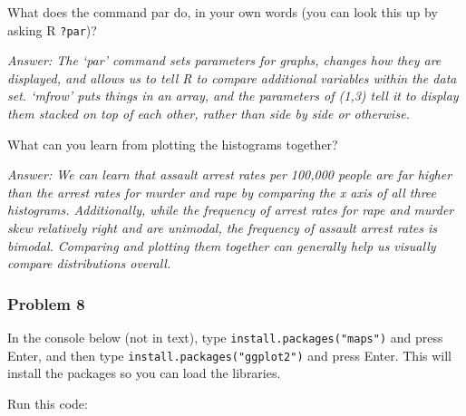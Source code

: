 \documentclass[
]{article}
\newenvironment{Shaded}{\begin{snugshade}}{\end{snugshade}}
\newcommand{\AttributeTok}[1]{\textcolor[rgb]{0.77,0.63,0.00}{#1}}
\newcommand{\CommentTok}[1]{\textcolor[rgb]{0.56,0.35,0.01}{\textit{#1}}}
\newcommand{\FunctionTok}[1]{\textcolor[rgb]{0.00,0.00,0.00}{#1}}
\newcommand{\NormalTok}[1]{#1}
\newcommand{\SpecialCharTok}[1]{\textcolor[rgb]{0.00,0.00,0.00}{#1}}
\newcommand{\StringTok}[1]{\textcolor[rgb]{0.31,0.60,0.02}{#1}}
\begin{document}
What does the command par do, in your own words (you can look this up by
asking R \texttt{?par})?

\emph{Answer: The `par' command sets parameters for graphs, changes how
they are displayed, and allows us to tell R to compare additional
variables within the data set. `mfrow' puts things in an array, and the
parameters of (1,3) tell it to display them stacked on top of each
other, rather than side by side or otherwise.}

What can you learn from plotting the histograms together?

\emph{Answer: We can learn that assault arrest rates per 100,000 people
are far higher than the arrest rates for murder and rape by comparing
the x axis of all three histograms. Additionally, while the frequency of
arrest rates for rape and murder skew relatively right and are unimodal,
the frequency of assault arrest rates is bimodal. Comparing and plotting
them together can generally help us visually compare distributions
overall.}

\hypertarget{problem-8}{%
\subsubsection{Problem 8}\label{problem-8}}

In the console below (not in text), type
\texttt{install.packages("maps")} and press Enter, and then type
\texttt{install.packages("ggplot2")} and press Enter. This will install
the packages so you can load the libraries.

Run this code:

\begin{Shaded}
\end{Shaded}
\end{document}

